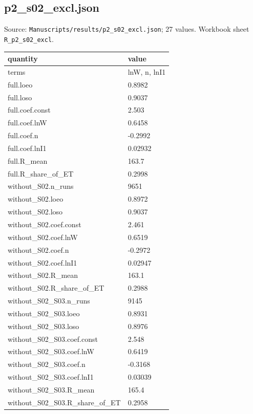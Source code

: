 \subsection*{p2\_s02\_excl.json}
\noindent\small Source: \nolinkurl{Manuscripts/results/p2_s02_excl.json}; 27 values. Workbook sheet \texttt{R\_p2\_s02\_excl}.\par
{\scriptsize\begin{longtable}{p{}p{}}\toprule\textbf{quantity} & \textbf{value}\\\midrule\endhead
{}terms & lnW, n, lnI1\\
{}full.loeo & 0.8982\\
{}full.loso & 0.9037\\
{}full.coef.const & 2.503\\
{}full.coef.lnW & 0.6458\\
{}full.coef.n & -0.2992\\
{}full.coef.lnI1 & 0.02932\\
{}full.R\_mean & 163.7\\
{}full.R\_share\_of\_ET & 0.2998\\
{}without\_S02.n\_runs & 9651\\
{}without\_S02.loeo & 0.8972\\
{}without\_S02.loso & 0.9037\\
{}without\_S02.coef.const & 2.461\\
{}without\_S02.coef.lnW & 0.6519\\
{}without\_S02.coef.n & -0.2972\\
{}without\_S02.coef.lnI1 & 0.02947\\
{}without\_S02.R\_mean & 163.1\\
{}without\_S02.R\_share\_of\_ET & 0.2988\\
{}without\_S02\_S03.n\_runs & 9145\\
{}without\_S02\_S03.loeo & 0.8931\\
{}without\_S02\_S03.loso & 0.8976\\
{}without\_S02\_S03.coef.const & 2.548\\
{}without\_S02\_S03.coef.lnW & 0.6419\\
{}without\_S02\_S03.coef.n & -0.3168\\
{}without\_S02\_S03.coef.lnI1 & 0.03039\\
{}without\_S02\_S03.R\_mean & 165.4\\
{}without\_S02\_S03.R\_share\_of\_ET & 0.2958\\
\bottomrule\end{longtable}}

